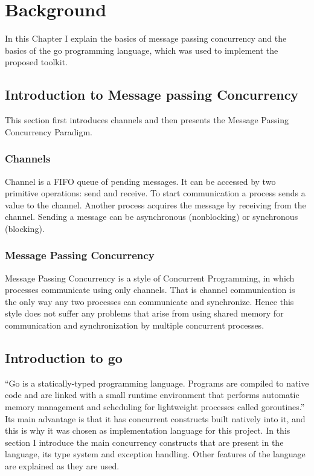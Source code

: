 \section{Background}
\label{sec:background}
In this Chapter I explain the basics of message passing concurrency and 
the basics of the go programming language, which was used to implement 
the proposed toolkit.

\subsection{Introduction to Message passing Concurrency}
This section first introduces channels and then presents the Message
Passing Concurrency Paradigm.

\subsubsection{Channels}
Channel is a FIFO queue of pending messages. It can be accessed by two
primitive operations: send and receive. To start communication
a process sends a value to the channel. Another process acquires the message
by receiving from the channel. Sending a message can be asynchronous (nonblocking)
or synchronous (blocking). \cite[293]{book:foundations}

\subsubsection{Message Passing Concurrency}
Message Passing Concurrency is a style of Concurrent Programming, in which
processes communicate using only channels. That is channel communication is 
the only way any two processes can communicate and synchronize. 
Hence this style does not 
suffer any problems that arise from using shared memory for communication 
and synchronization by multiple concurrent processes.

\subsection{Introduction to go}
``Go is a statically-typed programming language. Programs are compiled 
to native code and are linked with a small runtime environment that performs 
automatic memory management and scheduling for lightweight processes called 
goroutines.'' \cite[2]{whitehead} Its main advantage is 
that it has concurrent constructs built natively into it,
and this is why it was chosen as implementation language 
for this project.
In this section I introduce the main concurrency constructs that are
present in the language, its type system and exception handling. Other 
features of the language are explained as they are used.

